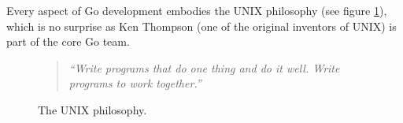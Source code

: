 Every aspect of Go development embodies the UNIX philosophy (see figure \ref{fig:unix_philosophy}), which is no surprise as Ken Thompson (one of the original inventors of UNIX) is part of the core Go team.

\begin{figure}[htbp]
	\begin{center}
		\begin{quote}
			\textit{``Write programs that do one thing and do it well. Write programs to work together.''} \cite{art_of_unix}
		\end{quote}
		\caption{The UNIX philosophy.}
		\label{fig:unix_philosophy}
	\end{center}
\end{figure}




